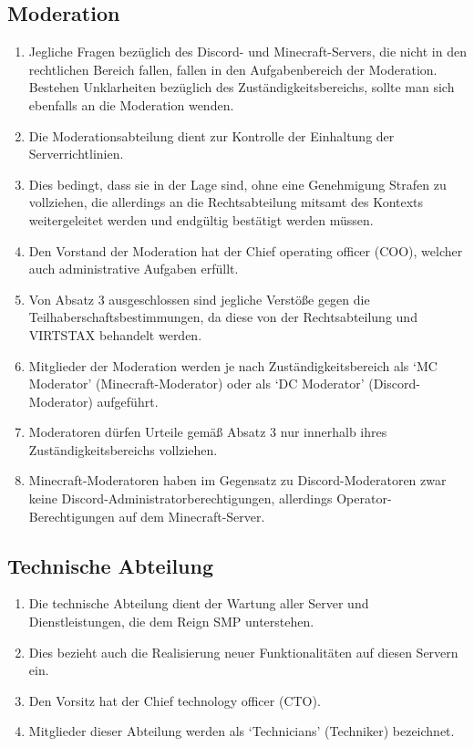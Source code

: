 \documentclass{article}
\begin{document}
\subsection{Moderation}\label{support}
\begin{enumerate}[(1)]
	\item Jegliche Fragen bezüglich des Discord- und Minecraft-Servers, die nicht in den rechtlichen Bereich fallen, fallen in den Aufgabenbereich der Moderation. Bestehen Unklarheiten bezüglich des Zuständigkeitsbereichs, sollte man sich ebenfalls an die Moderation wenden.
	\item Die Moderationsabteilung dient zur Kontrolle der Einhaltung der Serverrichtlinien.
	\item Dies bedingt, dass sie in der Lage sind, ohne eine Genehmigung Strafen zu vollziehen, die allerdings an die Rechtsabteilung mitsamt des Kontexts weitergeleitet werden und endgültig bestätigt werden müssen.
	\item Den Vorstand der Moderation hat der Chief operating officer (COO), welcher auch administrative Aufgaben erfüllt.
	\item Von Absatz 3 ausgeschlossen sind jegliche Verstöße gegen die Teilhaberschaftsbestimmungen, da diese von der Rechtsabteilung und VIRTSTAX behandelt werden.
	\item Mitglieder der Moderation werden je nach Zuständigkeitsbereich als `MC Moderator' (Minecraft-Moderator) oder als `DC Moderator' (Discord-Moderator) aufgeführt.
	\item Moderatoren dürfen Urteile gemäß Absatz 3 nur innerhalb ihres Zuständigkeitsbereichs vollziehen.
	\item Minecraft-Moderatoren haben im Gegensatz zu Discord-Moderatoren zwar keine Discord-Administratorberechtigungen, allerdings Operator-Berechtigungen auf dem Minecraft-Server.
\end{enumerate}

\subsection{Technische Abteilung}
\begin{enumerate}[(1)]
	\item Die technische Abteilung dient der Wartung aller Server und Dienstleistungen, die dem Reign SMP unterstehen.
	\item Dies bezieht auch die Realisierung neuer Funktionalitäten auf diesen Servern ein.
	\item Den Vorsitz hat der Chief technology officer (CTO).
	\item Mitglieder dieser Abteilung werden als `Technicians' (Techniker) bezeichnet.
\end{enumerate}
\end{document}
